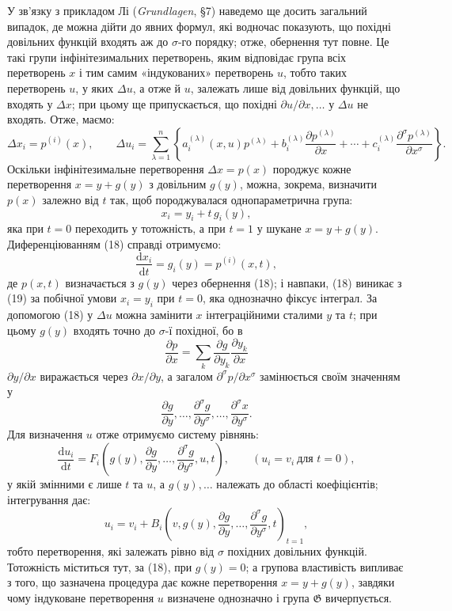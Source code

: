 \documentclass[11pt]{article}
\providecommand{\G}{\mathfrak G}
\providecommand{\D}{\Delta}
\providecommand{\p}{\partial}
\providecommand{\dd}{\mathrm d}
\begin{document}
У зв'язку з прикладом Лі (\emph{Grundlagen}, \S{}7) наведемо ще досить загальний випадок, де можна дійти до явних формул, які водночас показують, що похідні довільних функцій входять аж до \(\sigma\)-го порядку; отже, обернення тут повне. Це такі групи інфінітезимальних перетворень, яким відповідає група всіх перетворень \(x\) і тим самим «індукованих» перетворень \(u\), тобто таких перетворень \(u\), у яких \(\D u\), а отже й \(u\), залежать лише від довільних функцій, що входять у \(\D x\); при цьому ще припускається, що похідні \(\p u/\p x,\ldots\) у \(\D u\) не входять. Отже, маємо:
\[
\D x_i=p^{(i)}(x),\qquad
\D u_i=
\sum_{\lambda=1}^{n}\left\{
a_i^{(\lambda)}(x,u)p^{(\lambda)}
+b_i^{(\lambda)}\frac{\p p^{(\lambda)}}{\p x}
+\cdots+
c_i^{(\lambda)}\frac{\p^\sigma p^{(\lambda)}}{\p x^\sigma}
\right\}.
\]
Оскільки інфінітезимальне перетворення \(\D x=p(x)\) породжує кожне перетворення \(x=y+g(y)\) з довільним \(g(y)\), можна, зокрема, визначити \(p(x)\) залежно від \(t\) так, щоб породжувалася однопараметрична група:
\begin{equation}
x_i=y_i+t\,g_i(y),
\tag{18}
\end{equation}
яка при \(t=0\) переходить у тотожність, а при \(t=1\) у шукане \(x=y+g(y)\). Диференціюванням (18) справді отримуємо:
\begin{equation}
\frac{\dd x_i}{\dd t}=g_i(y)=p^{(i)}(x,t),
\tag{19}
\end{equation}
де \(p(x,t)\) визначається з \(g(y)\) через обернення (18); і навпаки, (18) виникає з (19) за побічної умови \(x_i=y_i\) при \(t=0\), яка однозначно фіксує інтеграл. За допомогою (18) у \(\D u\) можна замінити \(x\) інтеграційними сталими \(y\) та \(t\); при цьому \(g(y)\) входять точно до \(\sigma\)-ї похідної, бо в
\[
\frac{\p p}{\p x}=\sum_k\frac{\p g}{\p y_k}\frac{\p y_k}{\p x}
\]
\(\p y/\p x\) виражається через \(\p x/\p y\), а загалом \(\p^\sigma p/\p x^\sigma\) замінюється своїм значенням у
\[
\frac{\p g}{\p y},\ldots,\frac{\p^\sigma g}{\p y^\sigma},\ldots,\frac{\p^\sigma x}{\p y^\sigma}.
\]
Для визначення \(u\) отже отримуємо систему рівнянь:
\[
\frac{\dd u_i}{\dd t}
=
F_i\!\left(g(y),\frac{\p g}{\p y},\ldots,\frac{\p^\sigma g}{\p y^\sigma},u,t\right),
\qquad (u_i=v_i\ \text{для }t=0),
\]
у якій змінними є лише \(t\) та \(u\), а \(g(y),\ldots\) належать до області коефіцієнтів; інтегрування дає:
\[
u_i=v_i+
B_i\!\left(v,g(y),\frac{\p g}{\p y},\ldots,\frac{\p^\sigma g}{\p y^\sigma},t\right)_{t=1},
\]
тобто перетворення, які залежать рівно від \(\sigma\) похідних довільних функцій. Тотожність міститься тут, за (18), при \(g(y)=0\); а групова властивість випливає з того, що зазначена процедура дає кожне перетворення \(x=y+g(y)\), завдяки чому індуковане перетворення \(u\) визначене однозначно і група \(\G\) вичерпується.
\end{document}
